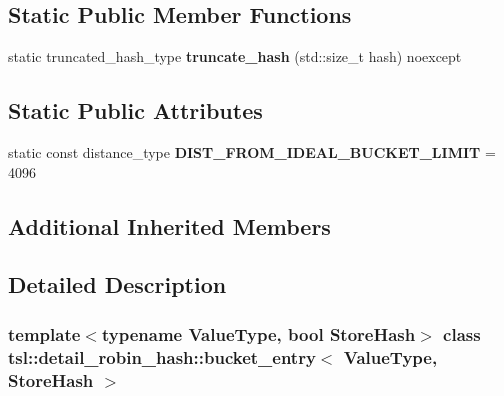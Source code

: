 \subsection*{Static Public Member Functions}
\begin{DoxyCompactItemize}
\item 
\mbox{\label{classtsl_1_1detail__robin__hash_1_1bucket__entry_a827cd16b440c902d67cc275513fc7d50}} 
static truncated\+\_\+hash\+\_\+type {\bfseries truncate\+\_\+hash} (std\+::size\+\_\+t hash) noexcept
\end{DoxyCompactItemize}
\subsection*{Static Public Attributes}
\begin{DoxyCompactItemize}
\item 
\mbox{\label{classtsl_1_1detail__robin__hash_1_1bucket__entry_af58b4cdc47b342af0afa91a9f36b4d27}} 
static const distance\+\_\+type {\bfseries D\+I\+S\+T\+\_\+\+F\+R\+O\+M\+\_\+\+I\+D\+E\+A\+L\+\_\+\+B\+U\+C\+K\+E\+T\+\_\+\+L\+I\+M\+IT} = 4096
\end{DoxyCompactItemize}
\subsection*{Additional Inherited Members}


\subsection{Detailed Description}
\subsubsection*{template$<$typename Value\+Type, bool Store\+Hash$>$\newline
class tsl\+::detail\+\_\+robin\+\_\+hash\+::bucket\+\_\+entry$<$ Value\+Type, Store\+Hash $>$}

